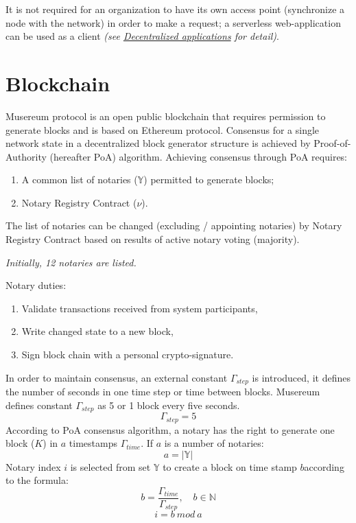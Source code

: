 \documentclass[12pt]{report}
\newcommand{\hlc}[1]{\colorbox{yellow!25}{#1}}
\begin{document}
It is not required for an organization to have its own access point (synchronize a node with the network) in order to make a request; a serverless web-application can be used as a client \textit{(see \hyperref[tech-apps]{Decentralized applications} for detail)}.

\section{Blockchain}
\label{tech-blockchain}
Musereum protocol is an open public blockchain that requires permission to generate blocks and is based on Ethereum protocol. Consensus for a single network state in a decentralized block generator structure is achieved by Proof-of-Authority (hereafter PoA) algorithm. Achieving consensus through PoA requires:
\begin{enumerate}
\item A common list of notaries ($\mathbb{Y}$) permitted to generate blocks;
\item Notary Registry Contract ($\nu$).
\end{enumerate}
The list of notaries can be changed (excluding / appointing notaries) by Notary Registry Contract based on results of active notary voting (majority).

\textit{Initially, 12 notaries are listed.}

Notary \hlc{duties}: 
\begin{enumerate}
\item Validate transactions received from system participants,
\item \hlc{Write changed state to a new block},
\item \hlc{Sign block chain} with a personal crypto-signature.
\end{enumerate}

In order to maintain consensus, an external constant $\Gamma_{step}$ is introduced, it defines the number of seconds in one time step or time between blocks. Musereum defines constant $\Gamma_{step}$ as 5 or 1 block every five seconds.
\begin{equation}
\Gamma_{step} = 5
\end{equation}
According to PoA consensus algorithm, a notary has the right to generate one block ($K$) in $a$ \hlc{timestamps} $\Gamma_{time}$. If $a$ is a number of notaries:
\begin{equation}
a = |\mathbb{Y}|
\end{equation}
Notary index $i$ is selected from set $\mathbb{Y}$ to create a block on time stamp $b$according to the formula: 
\begin{equation}
b = \frac{\Gamma_{time}}{\Gamma_{step}},  \quad b \in \mathbb{N} 
\end{equation}
\begin{equation}
i = b \ mod \ a
\end{equation}
\end{document}
